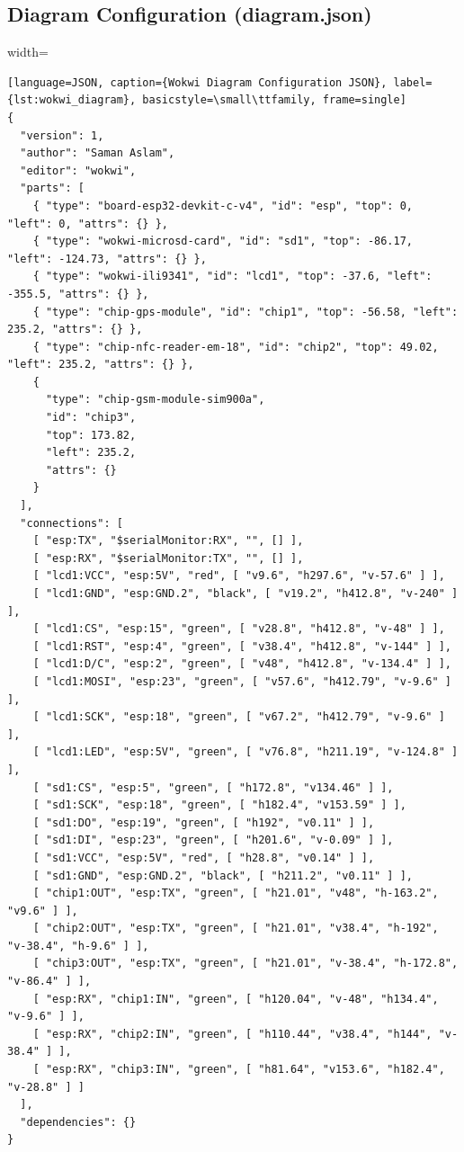 \subsection{Diagram Configuration (diagram.json)}
\begin{adjustbox}{width=\textwidth}
\begin{lstlisting}
[language=JSON, caption={Wokwi Diagram Configuration JSON}, label={lst:wokwi_diagram}, basicstyle=\small\ttfamily, frame=single]
{
  "version": 1,
  "author": "Saman Aslam",
  "editor": "wokwi",
  "parts": [
    { "type": "board-esp32-devkit-c-v4", "id": "esp", "top": 0, "left": 0, "attrs": {} },
    { "type": "wokwi-microsd-card", "id": "sd1", "top": -86.17, "left": -124.73, "attrs": {} },
    { "type": "wokwi-ili9341", "id": "lcd1", "top": -37.6, "left": -355.5, "attrs": {} },
    { "type": "chip-gps-module", "id": "chip1", "top": -56.58, "left": 235.2, "attrs": {} },
    { "type": "chip-nfc-reader-em-18", "id": "chip2", "top": 49.02, "left": 235.2, "attrs": {} },
    {
      "type": "chip-gsm-module-sim900a",
      "id": "chip3",
      "top": 173.82,
      "left": 235.2,
      "attrs": {}
    }
  ],
  "connections": [
    [ "esp:TX", "$serialMonitor:RX", "", [] ],
    [ "esp:RX", "$serialMonitor:TX", "", [] ],
    [ "lcd1:VCC", "esp:5V", "red", [ "v9.6", "h297.6", "v-57.6" ] ],
    [ "lcd1:GND", "esp:GND.2", "black", [ "v19.2", "h412.8", "v-240" ] ],
    [ "lcd1:CS", "esp:15", "green", [ "v28.8", "h412.8", "v-48" ] ],
    [ "lcd1:RST", "esp:4", "green", [ "v38.4", "h412.8", "v-144" ] ],
    [ "lcd1:D/C", "esp:2", "green", [ "v48", "h412.8", "v-134.4" ] ],
    [ "lcd1:MOSI", "esp:23", "green", [ "v57.6", "h412.79", "v-9.6" ] ],
    [ "lcd1:SCK", "esp:18", "green", [ "v67.2", "h412.79", "v-9.6" ] ],
    [ "lcd1:LED", "esp:5V", "green", [ "v76.8", "h211.19", "v-124.8" ] ],
    [ "sd1:CS", "esp:5", "green", [ "h172.8", "v134.46" ] ],
    [ "sd1:SCK", "esp:18", "green", [ "h182.4", "v153.59" ] ],
    [ "sd1:DO", "esp:19", "green", [ "h192", "v0.11" ] ],
    [ "sd1:DI", "esp:23", "green", [ "h201.6", "v-0.09" ] ],
    [ "sd1:VCC", "esp:5V", "red", [ "h28.8", "v0.14" ] ],
    [ "sd1:GND", "esp:GND.2", "black", [ "h211.2", "v0.11" ] ],
    [ "chip1:OUT", "esp:TX", "green", [ "h21.01", "v48", "h-163.2", "v9.6" ] ],
    [ "chip2:OUT", "esp:TX", "green", [ "h21.01", "v38.4", "h-192", "v-38.4", "h-9.6" ] ],
    [ "chip3:OUT", "esp:TX", "green", [ "h21.01", "v-38.4", "h-172.8", "v-86.4" ] ],
    [ "esp:RX", "chip1:IN", "green", [ "h120.04", "v-48", "h134.4", "v-9.6" ] ],
    [ "esp:RX", "chip2:IN", "green", [ "h110.44", "v38.4", "h144", "v-38.4" ] ],
    [ "esp:RX", "chip3:IN", "green", [ "h81.64", "v153.6", "h182.4", "v-28.8" ] ]
  ],
  "dependencies": {}
}
\end{lstlisting}
\end{adjustbox}

